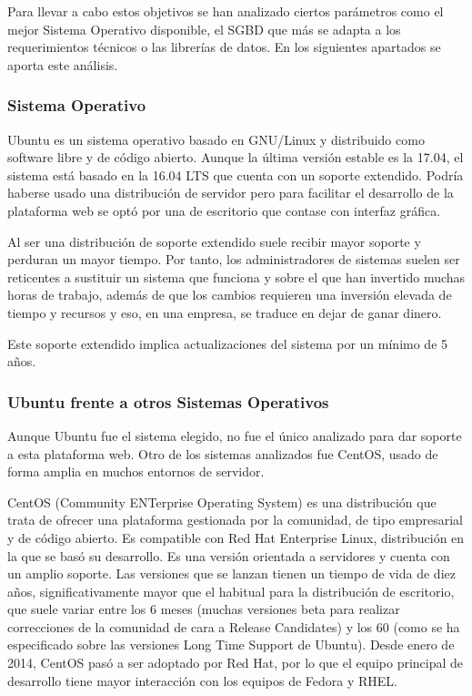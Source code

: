 Para llevar a cabo estos objetivos se han analizado ciertos parámetros como el mejor Sistema Operativo disponible, el SGBD que más se adapta a los requerimientos técnicos o las librerías de datos. En los siguientes apartados se aporta este análisis.

\subsubsection{Sistema Operativo}
Ubuntu es un sistema operativo basado en GNU/Linux y distribuido como software libre y de código abierto. Aunque la última versión estable es la 17.04, el sistema está basado en la 16.04 LTS que cuenta con un soporte extendido. Podría haberse usado una distribución de servidor pero para facilitar el desarrollo de la plataforma web se optó por una de escritorio que contase con interfaz gráfica.

Al ser una distribución de soporte extendido suele recibir mayor soporte y perduran un mayor tiempo. Por tanto, los administradores de sistemas suelen ser reticentes a sustituir un sistema que funciona y sobre el que han invertido muchas horas de trabajo, además de que los cambios requieren una inversión elevada de tiempo y recursos y eso, en una empresa, se traduce en dejar de ganar dinero.

Este soporte extendido implica actualizaciones del sistema por un mínimo de 5 años.

\subsubsection{Ubuntu frente a otros Sistemas Operativos}
Aunque Ubuntu fue el sistema elegido, no fue el único analizado para dar soporte a esta plataforma web. Otro de los sistemas analizados fue CentOS, usado de forma amplia en muchos entornos de servidor.

CentOS (Community ENTerprise Operating System) es una distribución que trata de ofrecer una plataforma gestionada por la comunidad, de tipo empresarial y de código abierto. Es compatible con Red Hat Enterprise Linux, distribución en la que se basó su desarrollo. Es una versión orientada a servidores y cuenta con un amplio soporte. Las versiones que se lanzan tienen un tiempo de vida de diez años, significativamente mayor que el habitual para la distribución de escritorio, que suele variar entre los 6 meses (muchas versiones beta para realizar correcciones de la comunidad de cara a Release Candidates) y los 60 (como se ha especificado sobre las versiones Long Time Support de Ubuntu). Desde enero de 2014, CentOS pasó a ser adoptado por Red Hat, por lo que el equipo principal de desarrollo tiene mayor interacción con los equipos de Fedora y RHEL.

